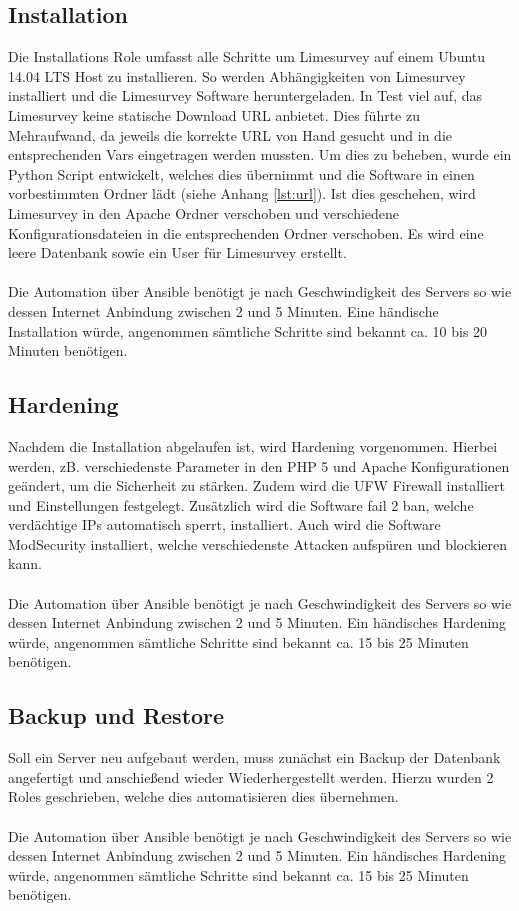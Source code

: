 \subsection{Installation}
Die Installations Role umfasst alle Schritte um Limesurvey auf einem Ubuntu 14.04 LTS Host zu installieren. So werden Abhängigkeiten von Limesurvey installiert und die Limesurvey Software heruntergeladen. In Test viel auf, das Limesurvey keine statische Download URL anbietet. Dies führte zu Mehraufwand, da jeweils die korrekte URL von Hand gesucht und in die entsprechenden Vars eingetragen werden mussten. Um dies zu beheben, wurde ein Python Script entwickelt, welches dies übernimmt und die Software in einen vorbestimmten Ordner lädt (siehe Anhang \ref{lst:url}).
Ist dies geschehen, wird Limesurvey in den Apache Ordner verschoben und verschiedene Konfigurationsdateien in die entsprechenden Ordner verschoben. Es wird eine leere Datenbank sowie ein User für Limesurvey erstellt.
\\\\
Die Automation über Ansible benötigt je nach Geschwindigkeit des Servers so wie dessen Internet Anbindung zwischen 2 und 5 Minuten. Eine händische Installation würde, angenommen sämtliche Schritte sind bekannt ca. 10 bis 20 Minuten benötigen.

\subsection{Hardening}
Nachdem die Installation abgelaufen ist, wird Hardening vorgenommen. Hierbei werden, zB. verschiedenste Parameter in den PHP 5 und Apache Konfigurationen geändert, um die Sicherheit zu stärken. Zudem wird die UFW Firewall installiert und Einstellungen festgelegt. Zusätzlich wird die Software fail 2 ban, welche verdächtige IPs automatisch sperrt, installiert. Auch wird die Software ModSecurity installiert, welche verschiedenste Attacken aufspüren und blockieren kann.
\\\\
Die Automation über Ansible benötigt je nach Geschwindigkeit des Servers so wie dessen Internet Anbindung zwischen 2 und 5 Minuten. Ein händisches Hardening würde, angenommen sämtliche Schritte sind bekannt ca. 15 bis 25 Minuten benötigen.
\subsection{Backup und Restore}
Soll ein Server neu aufgebaut werden, muss zunächst ein Backup der Datenbank angefertigt und anschießend wieder Wiederhergestellt werden.
Hierzu wurden 2 Roles geschrieben, welche dies automatisieren dies übernehmen.
\\\\
Die Automation über Ansible benötigt je nach Geschwindigkeit des Servers so wie dessen Internet Anbindung zwischen 2 und 5 Minuten. Ein händisches Hardening würde, angenommen sämtliche Schritte sind bekannt ca. 15 bis 25 Minuten benötigen.

